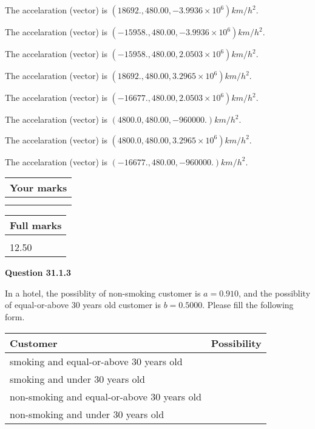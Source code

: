 \documentclass[12pt]{article}
\begin{document}
 
The accelaration (vector) is
$(
18692.,
480.00 ,
-3.9936 \times 10^{6}
)km/h^2.
$
 
 
The accelaration (vector) is
$(
-15958.,
480.00 ,
-3.9936 \times 10^{6}
)km/h^2.
$
 
 
The accelaration (vector) is
$(
-15958.,
480.00 ,
2.0503 \times 10^{6}
)km/h^2.
$
 
 
The accelaration (vector) is
$(
18692.,
480.00 ,
3.2965 \times 10^{6}
)km/h^2.
$
 
 
The accelaration (vector) is
$(
-16677.,
480.00 ,
2.0503 \times 10^{6}
)km/h^2.
$
 
 
The accelaration (vector) is
$(
4800.0,
480.00 ,
-960000.
)km/h^2.
$
 
 
The accelaration (vector) is
$(
4800.0,
480.00 ,
3.2965 \times 10^{6}
)km/h^2.
$
 
 
The accelaration (vector) is
$(
-16677.,
480.00 ,
-960000.
)km/h^2.
$
 
 
 
 

 
 
\vspace{0.3in}
  
\vspace{0.2in}
  
         \begin{tabular}{|l|}
\hline
 Your marks  \\
\hline
 \\ 
 \\ 
\hline
\end{tabular}
\hspace{0.05in} \begin{tabular}{|l|}
\hline
 Full marks  \\
\hline
 \\ 
12.50 \\
\hline
\end{tabular}
{\textbf{\Large{Question
31.1.3 
}}}
  
  
In a hotel, the possiblity of  %
non-smoking customer is
$a =  %
0.910$, and the possiblity of  %
equal-or-above 30 years old customer is $ b =  %
0.5000$.
Please fill the following form.
 
\noindent
\begin{tabular}{|l|l|}
\hline
Customer & Possibility \\
\hline
smoking  and   %
equal-or-above 30 years old  & \\
\hline
smoking  and   %
under 30 years old & \\
\hline
 non-smoking and   %
equal-or-above 30 years old  & \\
\hline
 non-smoking and  %
under 30 years old & \\
\hline
\end{tabular}
 
\end{document}
